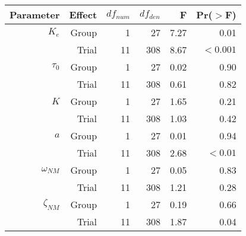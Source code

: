 \begin{tabular}{*{6}{r}}
    \toprule
    Parameter     & Effect & $df_{num}$ & $df_{den}$ & F    & Pr($>$F) \\
    \midrule
    $K_e        $ & Group  & 1          & 27         & 7.27 & 0.01     \\
                  & Trial  & 11         & 308        & 8.67 & $<0.001$ \\
    \midrule
    $\tau_0     $ & Group  & 1          & 27         & 0.02 & 0.90     \\
                  & Trial  & 11         & 308        & 0.61 & 0.82     \\
    \midrule
    $K          $ & Group  & 1          & 27         & 1.65 & 0.21     \\
                  & Trial  & 11         & 308        & 1.03 & 0.42     \\
    \midrule
    $a          $ & Group  & 1          & 27         & 0.01 & 0.94     \\
                  & Trial  & 11         & 308        & 2.68 & $<0.01$  \\
    \midrule
    $\omega_{NM}$ & Group  & 1          & 27         & 0.05 & 0.83     \\
                  & Trial  & 11         & 308        & 1.21 & 0.28     \\
    \midrule
    $\zeta_{NM} $ & Group  & 1          & 27         & 0.19 & 0.66     \\
                  & Trial  & 11         & 308        & 1.87 & 0.04     \\
    \bottomrule
\end{tabular}






